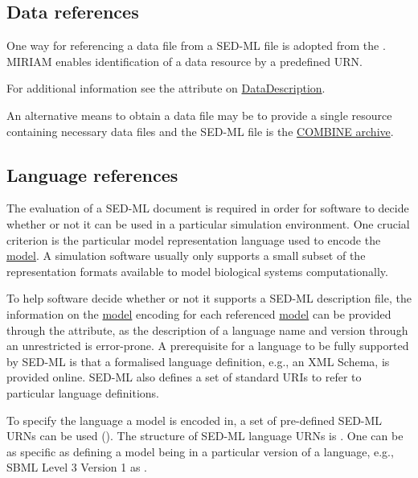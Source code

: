 \subsection{Data references}
\label{sec:dataURI}
One way for referencing a data file from a SED-ML file is adopted from the . MIRIAM enables identification of a data resource by a predefined URN. 

For additional information see the \hyperref[sec:data_source]{} attribute on \hyperref[class:dataDescription]{DataDescription}.

An alternative means to obtain a data file may be to provide a single resource containing necessary data files and the SED-ML file is the \hyperref[sec:archive]{COMBINE archive}. 


\subsection{Language references}
\label{sec:languageURI}
The evaluation of a SED-ML document is required in order for software to decide whether or not it can be used in a particular simulation environment. One crucial criterion is the particular model representation language used to encode the \hyperref[class:model]{model}. A simulation software usually only supports a small subset of the representation formats available to model biological systems computationally. 

To help  software decide whether or not it supports a SED-ML description file, the information on the \hyperref[class:model]{model} encoding for each referenced \hyperref[class:model]{model} can be provided through the \hyperref[sec:language]{} attribute, as the description of a language name and version through an unrestricted  is error-prone. 
A prerequisite for a language to be fully supported by SED-ML is that a formalised language definition, e.g., an XML Schema, is provided online. SED-ML also defines a set of standard URIs to refer to particular language definitions. 

To specify the language a model is encoded in, a set of pre-defined SED-ML URNs can be used (). The structure of SED-ML language URNs is \emph{}. One can be as specific as defining a model being in a particular version of a language, e.g., SBML Level 3 Version 1 as .

